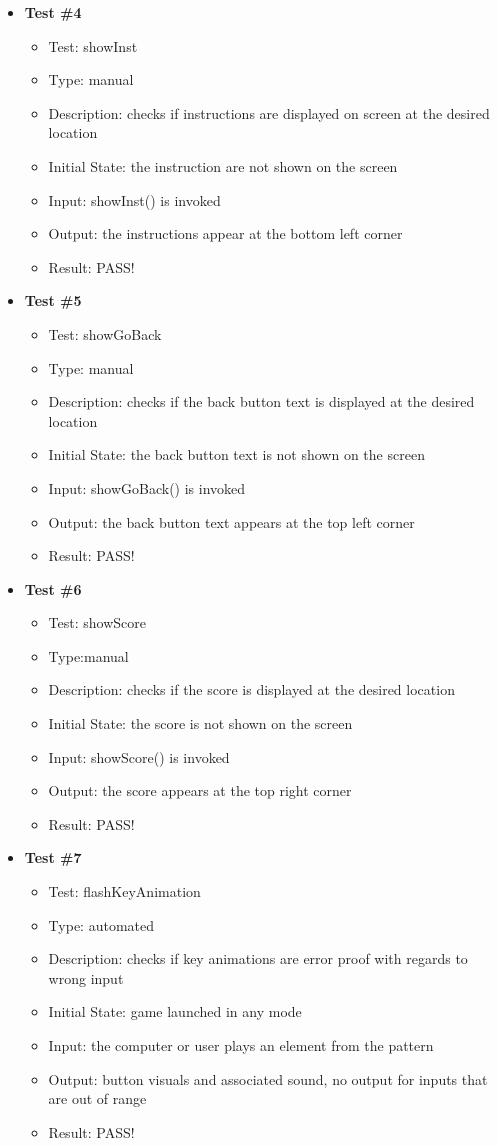 \documentclass[12pt, titlepage]{article}
\begin{document}
\begin{itemize}
\item \textbf {Test \#4}
\begin{itemize}
\item{Test: showInst}
\item{Type: manual}
\item{Description: checks if instructions are displayed on screen at the desired location}
\item{Initial State: the instruction are not shown on the screen}
\item{Input: showInst() is invoked}
\item{Output: the instructions appear at the bottom left corner}
\item{Result: PASS!}
\end{itemize}

\item \textbf {Test \#5}
\begin{itemize}
\item{Test: showGoBack}
\item{Type: manual}
\item{Description: checks if the back button text is displayed at the desired location}
\item{Initial State: the back button text is not shown on the screen}
\item{Input: showGoBack() is invoked}
\item{Output: the back button text appears at the top left corner}
\item{Result: PASS!}
\end{itemize}

\item \textbf {Test \#6}
\begin{itemize}
\item{Test: showScore}
\item{Type:manual }
\item{Description: checks if the score is displayed at the desired location}
\item{Initial State: the score is not shown on the screen}
\item{Input: showScore() is invoked}
\item{Output: the score appears at the top right corner}
\item{Result: PASS!}
\end{itemize}

\item \textbf {Test \#7}
\begin{itemize}
\item{Test: flashKeyAnimation}
\item{Type: automated}
\item{Description: checks if key animations are error proof with regards to wrong input}
\item{Initial State: game launched in any mode}
\item{Input: the computer or user plays an element from the pattern}
\item{Output: button visuals and associated sound, no output for inputs that are out of range}
\item{Result: PASS!}
\end{itemize}


\end{itemize}
\end{document}
